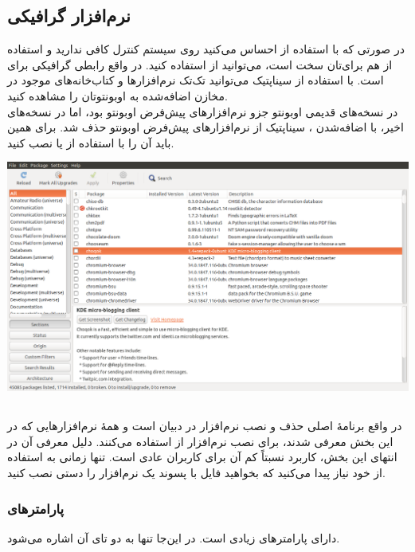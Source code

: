\subsection[نرم‌افزار گرافیکی Synaptic]{نرم‌افزار گرافیکی }
در صورتی که با استفاده از  احساس می‌کنید روی سیستم کنترل کافی ندارید و استفاده از  هم برای‌تان سخت است، می‌توانید از  استفاده کنید.  در واقع رابطی گرافیکی برای  است. با استفاده از سیناپتیک می‌توانید تک‌تک نرم‌افزارها و کتاب‌خانه‌های موجود در مخازن اضافه‌شده به اوبونتوتان را مشاهده کنید.\\
 در نسخه‌های قدیمی اوبونتو جزو نرم‌افزارهای پیش‌فرض اوبونتو بود، اما در نسخه‌های اخیر، با اضافه‌شدن ، سیناپتیک از نرم‌افزارهای پیش‌فرض اوبونتو حذف شد. برای همین باید آن را با استفاده از  یا  نصب کنید.

\begin{center}
\includegraphics[scale=0.37]{pics/38.png}
\end{center}


\subsection[dpkg]{}
 در واقع برنامهٔ اصلی حذف و نصب نرم‌افزار در دبیان است و همهٔ نرم‌افزارهایی که در این بخش معرفی شدند، برای نصب نرم‌افزار از  استفاده می‌کنند. دلیل معرفی آن در انتهای این بخش، کاربرد نسبتاً کم آن برای کاربران عادی است. تنها زمانی به استفاده از خود  نیاز پیدا می‌کنید که بخواهید فایل با پسوند  یک نرم‌افزار را دستی نصب کنید.\\

\subsubsection[پارامترهای dpkg]{پارامترهای }
 دارای پارامترهای زیادی است. در این‌جا تنها به دو تای آن اشاره می‌شود.

